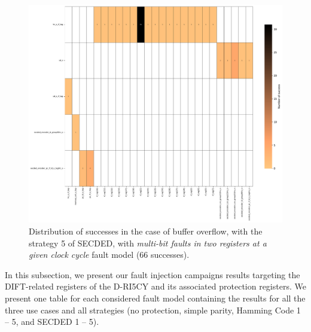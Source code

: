 \begin{figure}[ht]
    \centering
    \includegraphics[width=\textwidth]{c6_group_composition/img/heatmap_buffer_overflow_secded_5_multi_bitflip_reg_multi_2.pdf}
    \caption{Distribution of successes in the case of buffer overflow, with the strategy 5 of SECDED, with \textit{multi-bit faults in two registers at a given clock cycle} fault model (66 successes).}
    \label{fig:heatmap_bo_multireg_sd5}
\end{figure}

In this subsection, we present our fault injection campaigns results targeting the DIFT-related registers of the D-RI5CY and its associated protection registers. We present one table for each considered fault model containing the results for all the three use cases and all strategies (no protection, simple parity, Hamming Code 1 -- 5, and SECDED 1 -- 5).

